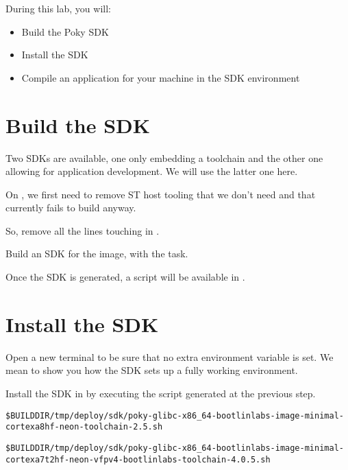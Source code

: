 
During this lab, you will:
\begin{itemize}
  \item Build the Poky SDK
  \item Install the SDK
  \item Compile an application for your machine in the SDK
    environment
\end{itemize}

\section{Build the SDK}

Two SDKs are available, one only embedding a toolchain and the
other one allowing for application development. We will use the latter one
here.

\if{}
On , we first need to remove ST host tooling that we
don't need and that currently fails to build anyway.

So, remove all the lines touching  in
.
\fi

Build an SDK for the  image, with
the  task.

Once the SDK is generated, a script will be available in
.

\section{Install the SDK}

Open a new terminal to be sure that no extra environment variable is set.
We mean to show you how the SDK sets up a fully working environment.

Install the SDK in  by executing the script
generated at the previous step.

{\footnotesize
\if{}
\begin{verbatim}
$BUILDDIR/tmp/deploy/sdk/poky-glibc-x86_64-bootlinlabs-image-minimal-cortexa8hf-neon-toolchain-2.5.sh
\end{verbatim}
\fi
\if{}
\begin{verbatim}
$BUILDDIR/tmp/deploy/sdk/poky-glibc-x86_64-bootlinlabs-image-minimal-cortexa7t2hf-neon-vfpv4-bootlinlabs-toolchain-4.0.5.sh
\end{verbatim}
\fi
}

